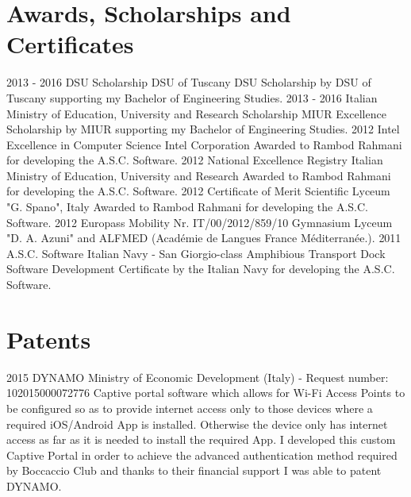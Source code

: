 \documentclass[]{friggeri-cv}
\begin{document}
\section{Awards, Scholarships and Certificates}
\vspace{-3mm}
\begin{entrylist}
\entry
{2013 - 2016}
{DSU Scholarship}
{DSU of Tuscany}
{DSU Scholarship by DSU of Tuscany supporting my Bachelor of Engineering Studies.}
\entry
{2013 - 2016}
{Italian Ministry of Education, University and Research Scholarship}
{MIUR}
{Excellence Scholarship by MIUR supporting my Bachelor of Engineering Studies.}
\entry
{2012}
{Intel Excellence in Computer Science}
{Intel Corporation}
{Awarded to Rambod Rahmani for developing the A.S.C. Software.}
\entry
{2012}
{National Excellence Registry}
{Italian Ministry of Education, University and Research}
{Awarded to Rambod Rahmani for developing the A.S.C. Software.}
\entry
{2012}
{Certificate of Merit}
{Scientific Lyceum "G. Spano", Italy}
{Awarded to Rambod Rahmani for developing the A.S.C. Software.}
\entry
{2012}
{Europass Mobility Nr. IT/00/2012/859/10}
{}
{Gymnasium Lyceum "D. A. Azuni" and ALFMED (Acad\'emie de Langues France M\'editerran\'ee.).}
\entry
{2011}
{A.S.C. Software}
{Italian Navy - San Giorgio-class Amphibious Transport Dock}
{Software Development Certificate by the Italian Navy for developing the A.S.C. Software.}
\end{entrylist}


\section{Patents}
\vspace{-3mm}
\begin{entrylist}
\entry
{2015}
{DYNAMO}
{Ministry of Economic Development (Italy) - Request number: 102015000072776}
{Captive portal software which allows for Wi-Fi Access Points to be configured so as to provide internet access only to those devices where a required iOS/Android App is installed. Otherwise the device only has internet access as far as it is needed to install the required App. I developed this custom Captive Portal in order to achieve the advanced authentication method required by Boccaccio Club and thanks to their financial support I was able to patent DYNAMO.}
\end{entrylist}
\end{document}
